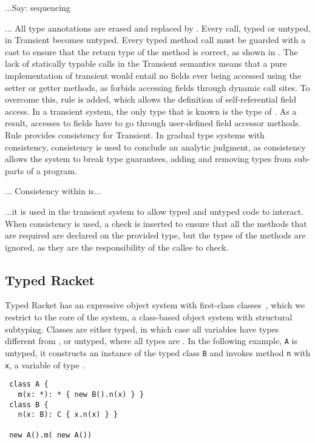 \documentclass[acmlarge, anonymous, authordraft]{acmart}
\newcommand{\code}[1]{{\tt #1}\xspace}
\begin{document}
...Say: sequencing


... All type
annotations are erased and replaced by \any.  Every call, typed or untyped,
in Transient becomes untyped.  Every typed method call must be guarded with
a cast to ensure that the return type of the method is correct, as shown in
.  The lack of statically typable calls in the Transient
semantics means that a pure implementation of transient would entail no
fields ever being accessed using the setter or getter methods, as \kafka
forbids accessing fields through dynamic call sites. To overcome this, rule
 is added, which allows the definition of self-referential
field access. In a transient system, the only type that is known is the type
of \this.  As a result, accesses to fields have to go through user-defined
field accessor methods.  Rule  provides consistency for
Transient. In gradual type systems with consistency, consistency is used to
conclude an analytic judgment, as consistency allows the system to break
type guarantees, adding and removing types from sub-parts of a
program. 

... Consistency within \kafka is...

...it is used in the transient system to allow typed and untyped code to
interact. When consistency is used, a check is inserted to ensure that all
the methods that are required are declared on the provided type, but the
types of the methods are ignored, as they are the responsibility of the
callee to check.






\subsection{Typed Racket}

Typed Racket has an expressive object system with first-class
classes~\cite{Takikawa:2012}, which we restrict to the core of the system, a
class-based object system with structural subtyping. Classes are either typed,
in which case all variables have types different from \any, or untyped, where
all types are \any.  In the following example, \code A is untyped, it constructs
an instance of the typed class \code{B} and invokes method \code{n} with \code
x, a variable of type \any.

\begin{lstlisting}
 class A {
   m(x: *): * { new B().n(x) } }
 class B {
   n(x: B): C { x.n(x) } }

 new A().m( new A())
\end{lstlisting}
\end{document}
